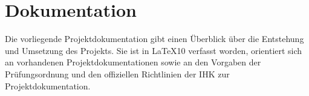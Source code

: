 \section{Dokumentation}
\label{sec:Dokumentation}

%
Die vorliegende Projektdokumentation gibt einen Überblick über die Entstehung und Umsetzung des Projekts.
Sie ist in LaTeX10 verfasst worden, orientiert sich an vorhandenen Projektdokumentationen sowie an den Vorgaben der Prüfungsordnung und den offiziellen Richtlinien der IHK zur Projektdokumentation.